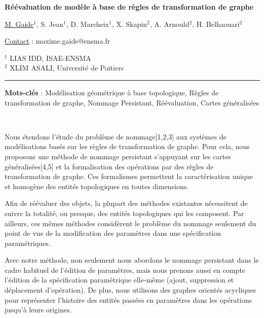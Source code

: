 \documentclass[11pt,a4paper]{article}
\begin{document}
\begin{center}
	{\Large \textbf{Réévaluation de modèle à base de règles de transformation de graphe}}
\end{center}

{\underline{M. Gaide}$^{1}$, S. Jean$^{1}$, D. Marcheix$^{1}$, X. Skapin$^{2}$, A. Arnould$^{2}$, H. Belhaouari$^{2}$}
\begin{flushright}
	\underline{Contact} : maxime.gaide@ensma.fr
\end{flushright}

\begin{flushleft}
	\scriptsize{
		$^1$	LIAS IDD, ISAE-ENSMA\\
		$^2$	XLIM ASALI, Université de Poitiers
	}
\end{flushleft}

\rule{1\linewidth}{3pt}

\textbf{Mots-clés} : Modélisation géométrique à base topologique, Règles de
transformation de graphe, Nommage Persistant, Réévaluation, Cartes généralisées

~

Nous étendons l'étude du problème de nommage[1,2,3] aux
systèmes de modélisations basés sur les règles de transformation de graphe. %
Pour cela, nous proposons une méthode de nommage persistant s'appuyant sur les
cartes généralisées[4,5] et la formalisation des opérations par des règles de
transformation de graphe. %
Ces formalismes permettent la caractérisation unique et homogène des entités
topologiques en toutes dimensions. %

Afin de réévaluer des objets, la plupart des méthodes existantes nécessitent de
suivre la totalité, ou presque, des entités topologiques qui les composent. %
Par ailleurs, ces mêmes méthodes considèrent le problème du nommage seulement du
point de vue de la modification des paramètres dans une spécification
paramétriques. %

Avec notre méthode, non seulement nous abordons le nommage persistant dans le
cadre habituel de l'édition de paramètres, mais nous prenons aussi en compte
l'édition de la spécification paramétrique elle-même (ajout, suppression et
déplacement d'opération). %
De plus, nous utilisons des graphes orientés acycliques pour représenter
l'histoire des entités passées en paramètres dans les opérations jusqu'à leurs
origines. %
\end{document}
